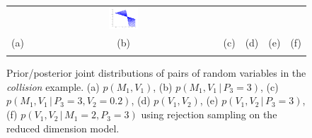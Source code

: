 \documentclass{article}
\newcommand{\pr}{p}
\newcommand{\nn}{0.16}
\begin{document}
\begin{figure}[t!]
\begin{center}
\begin{tabular}{cccccc}
& \hspace{-3mm} \includegraphics[width=\nn\textwidth]{Figs/colV1V2givenPis3M1is2.png}
\vspace{-1.5mm}
\\
   \hspace{-5mm} \footnotesize(a) 
& \hspace{-4mm} \footnotesize(b) 
& \hspace{-3mm} \footnotesize(c) 
&\hspace{-1mm} \footnotesize(d) 
&\hspace{-1mm} \footnotesize(e) 
&\hspace{-1mm} \footnotesize(f)\\
\multicolumn{6}{c}{}
\end{tabular}
\end{center}
\vspace{-8mm}
\caption{\footnotesize
Prior/posterior joint distributions of pairs of random variables in the \emph{collision} example. 
(a) $\pr(M_1, V_1)$,
(b) $\pr(M_1, V_1 \, | \, P_3 = 3)$,
(c) $\pr(M_1, V_1 \, | \, P_3 = 3, V_2 = 0.2)$,
(d) $\pr(V_1, V_2)$,
(e) $\pr(V_1, V_2 \, | \, P_3 = 3)$,
(f) $\pr(V_1, V_2 \, | \, M_1 =2, P_3 = 3)$
using rejection sampling on the reduced dimension model.
} 
\label{fig:mom}
\end{figure}
\end{document}
